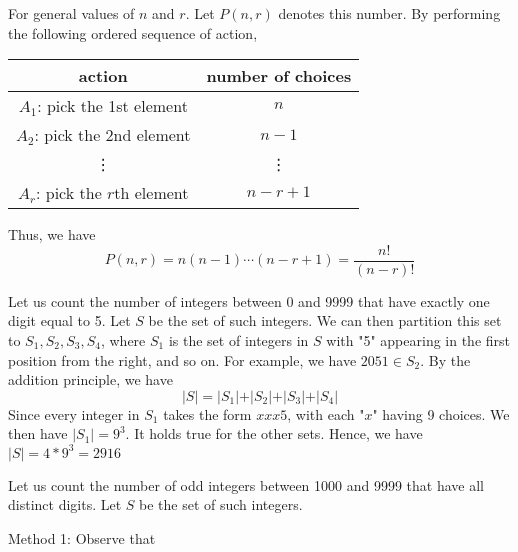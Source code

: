 For general values of \(n\) and \(r\). Let \(P(n, r)\) denotes this number. By performing the following ordered sequence of action,
\begin{table}[H]
    \centering
    \begin{tabular}{c|c}
            action & number of choices  \\
        \midrule
            \(A_1\): pick the 1st element & \(n\)   \\
            \(A_2\): pick the 2nd element & \(n - 1\)   \\
            \vdots & \vdots  \\
            \(A_r\): pick the \(r\)th element & \(n - r + 1\)
    \end{tabular}
\end{table}
Thus, we have
\[
    P(n, r) = n(n - 1)\cdots(n - r + 1) = \dfrac{n!}{(n - r)!}
\]

\begin{eg}
    Let us count the number of integers between 0 and 9999 that have exactly one digit equal to 5. Let \(S\) be the set of such integers. We can then partition this set to \(S_1, S_2, S_3, S_4\),  where \(S_1\) is the set of integers in \(S\) with "5" appearing in the first position from the right, and so on. For example, we have \(2051 \in S_2\). By the addition principle, we have
    \[
        \vert S \vert = \vert S_1 \vert + \vert S_2 \vert + \vert S_3 \vert + \vert S_4 \vert 
    \]
    Since every integer in \(S_1\) takes the form \(xxx5\), with each "\(x\)" having 9 choices. We then have \(\vert S_1 \vert = 9^3\). It holds true for the other sets. Hence, we have \(\vert S \vert = 4 * 9^3 = 2916\)
\end{eg}

\begin{eg}
    Let us count the number of odd integers between 1000 and 9999 that have all distinct digits. Let \(S\) be the set of such integers. 
    
    Method 1: Observe that 
\end{eg}